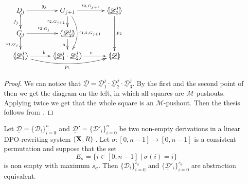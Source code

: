 \documentclass[a4paper,UKenglish,cleveref,pdftex,thm-restate,numberwithinsect,anonymous]{lipics}
\def\R{\mathsf{R}}
\def\X{\textbf {\textup{X}}}
\newcommand{\dder}[1]{\mathscr{#1}}
\newcommand{\der}[1]{\underline{\dder{#1}}}
\newcommand{\lpro}{\langle \hspace{-1.85pt}[}
\newcommand{\rpro}{]\hspace{-1.85pt}\rangle}
\newcommand{\tpro}[1]{\lpro \der{#1}\rpro}
\begin{document}
\noindent 
\parbox{5cm}{\vspace{1em}$
\xymatrix@C=30pt@R=15pt{D_{j} \ar[r]^{g_j}\ar@{>->}[d]_{f_j}& G_{j+1}
	\ar[r]^-{\iota_{3,G_{j+1}}} \ar[d]_{\iota_{2, G_{j+1}}}
	\ar@/^.5cm/[dd]^{\iota_{1,2, G_{j+1}}}& \lpro \der{D}^j_3\rpro
	\ar[dd]^{p_2} \\ G_j \ar[r]^{\iota_{2,
			G_j}}\ar@{>->}[d]_{\iota_{1,G_j}} & \lpro \der{D}^j_2\rpro
	\ar[d]_a\\ \lpro \der{D}^j_1 \rpro \ar@/_.4cm/[rr]_{p_1}
	\ar[r]^b &\lpro \der{D}^j_1\cdot \der{D}^j_2 \rpro
	\ar[r]^c&\tpro{D} }$}\qquad  \qquad
\parbox{7.5cm}{\begin{proof}
	We can notice that
	$\der{D}=\der{D}^j_1\cdot \der{D}^j_2 \cdot \der{D}^j_3$. By the
	first and the second point of  then we get the
	 diagram on the left, in which all squares are $\mathcal{M}$-pushouts. Applying  twice we get that the whole square is an
	$\mathcal{M}$-pushout. Then the thesis follows from
	.
\end{proof}}


\begin{lemma}\label{lem:idevero}
	Let $\der{D}=\{\dder{D}_{i}\}_{i=0}^n$ and $\der{D}'=\{\dder{D}'_i\}_{i=0}^n$ be two non-empty derivations in a linear DPO-rewriting system $(\X, \R)$ . Let  $\sigma:[0,n-1]\to [0,n-1]$  is a consistent permutation and suppose that the set 
	\[E_{\sigma}=\{i\in [0,n-1]\mid \sigma(i)=i\}\]
	is non empty with maximum $s_\sigma$. Then $\{\dder{D}_i\}_{i=0}^{s_\sigma}$ and $\{\der{D}'_i\}_{i=0}^{s_\sigma}$ are abstraction equivalent.  
\end{lemma}
\end{document}
